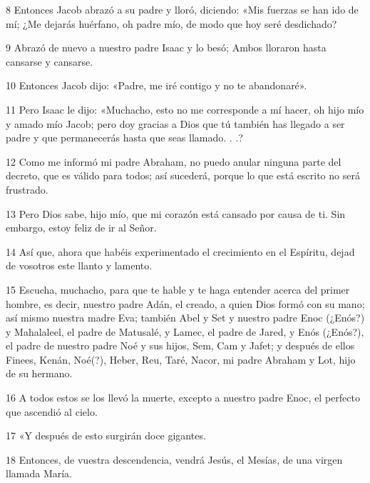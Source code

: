 \par 8 Entonces Jacob abrazó a su padre y lloró, diciendo: «Mis fuerzas se han ido de mí; ¿Me dejarás huérfano, oh padre mío, de modo que hoy seré desdichado?

\par 9 Abrazó de nuevo a nuestro padre Isaac y lo besó; Ambos lloraron hasta cansarse y cansarse.

\par 10 Entonces Jacob dijo: «Padre, me iré contigo y no te abandonaré».

\par 11 Pero Isaac le dijo: «Muchacho, esto no me corresponde a mí hacer, oh hijo mío y amado mío Jacob; pero doy gracias a Dios que tú también has llegado a ser padre y que permanecerás hasta que seas llamado. . .?

\par 12 Como me informó mi padre Abraham, no puedo anular ninguna parte del decreto, que es válido para todos; así sucederá, porque lo que está escrito no será frustrado.

\par 13 Pero Dios sabe, hijo mío, que mi corazón está cansado por causa de ti. Sin embargo, estoy feliz de ir al Señor.

\par 14 Así que, ahora que habéis experimentado el crecimiento en el Espíritu, dejad de vosotros este llanto y lamento.

\par 15 Escucha, muchacho, para que te hable y te haga entender acerca del primer hombre, es decir, nuestro padre Adán, el creado, a quien Dios formó con su mano; así mismo nuestra madre Eva; también Abel y Set y nuestro padre Enoc (¿Enós?) y Mahalaleel, el padre de Matusalé, y Lamec, el padre de Jared, y Enós (¿Enós?), el padre de nuestro padre Noé y sus hijos, Sem, Cam y Jafet; y después de ellos Finees, Kenán, Noé(?), Heber, Reu, Taré, Nacor, mi padre Abraham y Lot, hijo de su hermano.

\par 16 A todos estos se los llevó la muerte, excepto a nuestro padre Enoc, el perfecto que ascendió al cielo.

\par 17 «Y después de esto surgirán doce gigantes.

\par 18 Entonces, de vuestra descendencia, vendrá Jesús, el Mesías, de una virgen llamada María.

